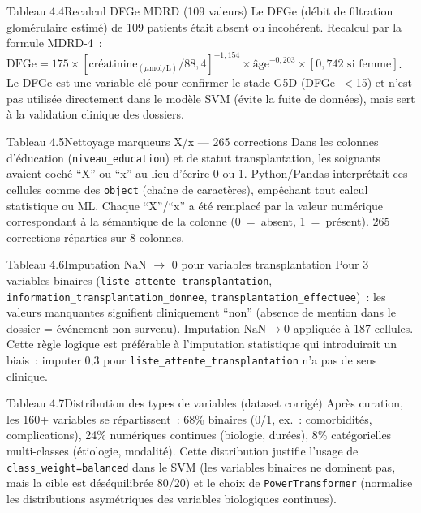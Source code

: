 \documentclass[12pt,a4paper]{article}
\begin{document}
\begin{figbox}{Tableau 4.4}{Recalcul DFGe MDRD (109 valeurs)}
Le DFGe (débit de filtration glomérulaire estimé) de 109 patients était absent
ou incohérent. Recalcul par la formule MDRD-4~:
$\text{DFGe} = 175 \times [\text{créatinine}_{(\mu\text{mol/L})}/88{,}4]^{-1{,}154} \times
\text{âge}^{-0{,}203} \times [0{,}742\text{ si femme}]$.
Le DFGe est une variable-clé pour confirmer le stade G5D (DFGe~$<$15) et
n'est pas utilisée directement dans le modèle SVM (évite la fuite de données),
mais sert à la validation clinique des dossiers.
\end{figbox}

\begin{figbox}{Tableau 4.5}{Nettoyage marqueurs X/x --- 265 corrections}
Dans les colonnes d'éducation (\texttt{niveau\_education}) et de statut
transplantation, les soignants avaient coché ``X'' ou ``x'' au lieu d'écrire
0 ou 1. Python/Pandas interprétait ces cellules comme des \texttt{object}
(chaîne de caractères), empêchant tout calcul statistique ou ML. Chaque ``X''/``x''
a été remplacé par la valeur numérique correspondant à la sémantique de la
colonne (0~=~absent, 1~=~présent). 265 corrections réparties sur 8 colonnes.
\end{figbox}

\begin{figbox}{Tableau 4.6}{Imputation NaN $\rightarrow$ 0 pour variables transplantation}
Pour 3 variables binaires (\texttt{liste\_attente\_transplantation},
\texttt{information\_transplantation\_donnee}, \texttt{transplantation\_effectuee})~:
les valeurs manquantes signifient cliniquement ``non'' (absence de mention dans
le dossier = événement non survenu). Imputation $\text{NaN} \rightarrow 0$
appliquée à 187 cellules. Cette règle logique est préférable à l'imputation
statistique qui introduirait un biais~: imputer 0{,}3 pour
\texttt{liste\_attente\_transplantation} n'a pas de sens clinique.
\end{figbox}

\begin{figbox}{Tableau 4.7}{Distribution des types de variables (dataset corrigé)}{%
Après curation, les 160+ variables se répartissent~: 68\% binaires (0/1,
ex.~: comorbidités, complications), 24\% numériques continues (biologie,
durées), 8\% catégorielles multi-classes (étiologie, modalité). Cette
distribution justifie l'usage de \texttt{class\_weight=balanced} dans le SVM
(les variables binaires ne dominent pas, mais la cible est déséquilibrée
80/20) et le choix de \texttt{PowerTransformer} (normalise les distributions
asymétriques des variables biologiques continues).}
\end{figbox}
\end{document}
